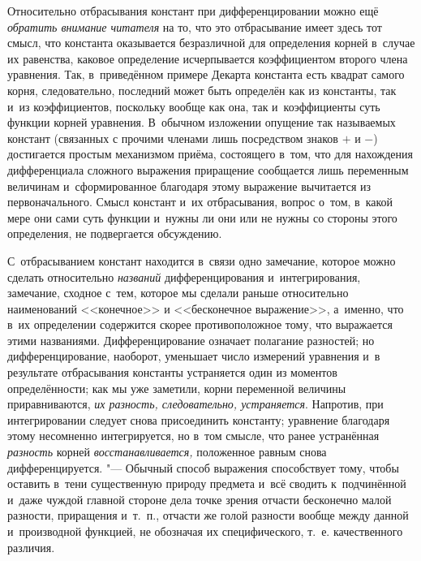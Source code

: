 Относительно отбрасывания констант при дифференцировании можно ещё
{\em обратить внимание читателя} на то, что это отбрасывание имеет здесь тот
смысл, что константа оказывается безразличной для определения корней в~случае
их равенства, каковое определение исчерпывается коэффициентом второго члена
уравнения. Так, в~приведённом примере Декарта константа есть квадрат самого
корня, следовательно, последний может быть определён как из константы, так и~из
коэффициентов, поскольку вообще как она, так и~коэффициенты суть функции корней
уравнения. В~обычном изложении опущение так называемых констант (связанных с
прочими членами лишь посредством знаков $+$ и $-$) достигается простым
механизмом приёма, состоящего в~том, что для нахождения дифференциала сложного
выражения приращение сообщается лишь переменным величинам и~сформированное
благодаря этому выражение вычитается из первоначального. Смысл констант и~их
отбрасывания, вопрос о~том, в~какой мере они сами суть функции и~нужны ли они
или не нужны со стороны этого определения, не подвергается обсуждению.

С~отбрасыванием констант находится в~связи одно замечание, которое можно
сделать относительно {\em названий} дифференцирования и~интегрирования,
замечание, сходное с~тем, которое мы сделали раньше относительно наименований
<<конечное>> и <<бесконечное выражение>>, а~именно, что в~их
определении содержится скорее противоположное тому, что выражается этими
названиями. Дифференцирование означает полагание разностей; но
дифференцирование, наоборот, уменьшает число измерений уравнения и~в результате
отбрасывания константы устраняется один из моментов определённости; как мы уже
заметили, корни переменной величины приравниваются,
{\em их разность, следовательно, устраняется}. Напротив, при интегрировании
следует снова присоединить константу; уравнение благодаря этому несомненно
интегрируется, но в~том смысле, что ранее устранённая {\em разность} корней
{\em восстанавливается,} положенное равным снова дифференцируется. "--- Обычный
способ выражения способствует тому, чтобы оставить в~тени существенную природу
предмета и~всё сводить к~подчинённой и~даже чуждой главной стороне дела точке
зрения отчасти бесконечно малой разности, приращения и~т.~п., отчасти же голой
разности вообще между данной и~производной функцией, не обозначая их
специфического, т.~е. качественного различия.

